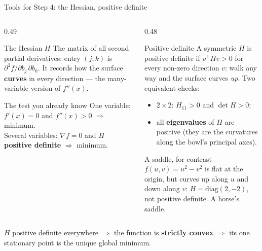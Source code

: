 \documentclass[aspectratio=169]{beamer}
\begin{document}
\begin{frame}[shrink=6]{Tools for Step 4: the Hessian, positive definite}
  \begin{columns}[T]
    \begin{column}{0.49\textwidth}
      \begin{block}{The Hessian $H$}
        \small The matrix of all second partial derivatives: entry $(j,k)$ is
        $\partial^2 f/\partial b_j\,\partial b_k$. It records how the surface
        \textbf{curves} in every direction --- the many-variable version of
        $f''(x)$.
      \end{block}
      \begin{block}{The test you already know}
        \small One variable: $f'(x)=0$ and $f''(x)>0$ $\Rightarrow$ minimum.\\
        Several variables: $\nabla f = 0$ and $H$ \textbf{positive definite}
        $\Rightarrow$ minimum.
      \end{block}
    \end{column}
    \begin{column}{0.48\textwidth}
      \begin{block}{Positive definite}
        \small A symmetric $H$ is positive definite if
        $v^{\!\top}Hv > 0$ for every non-zero direction $v$: walk any way and
        the surface curves \emph{up}. Two equivalent checks:
        \begin{itemize}
          \item $2\times2$: $H_{11} > 0$ and $\det H > 0$;
          \item all \textbf{eigenvalues} of $H$ are positive (they are the
            curvatures along the bowl's principal axes).
        \end{itemize}
      \end{block}
      \begin{block}{A saddle, for contrast}
        \small $f(u,v) = u^2 - v^2$ is flat at the origin, but curves up
        along $u$ and down along $v$: $H = \mathrm{diag}(2,-2)$, not
        positive definite. A horse's saddle.
      \end{block}
    \end{column}
  \end{columns}
  \begin{center}\small
    $H$ positive definite everywhere $\Rightarrow$ the function is
    \textbf{strictly convex} $\Rightarrow$ its one stationary point is the
    unique global minimum.
  \end{center}
\end{frame}
\end{document}

